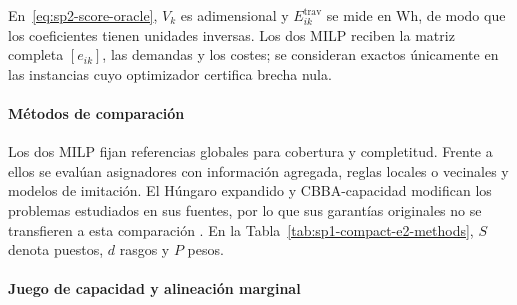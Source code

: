 En~\eqref{eq:sp2-score-oracle}, $V_k$ es adimensional y $E_{ik}^{\mathrm{trav}}$ se mide en Wh, de modo que los coeficientes tienen unidades inversas. Los dos MILP reciben la matriz completa $[e_{ik}]$, las demandas y los costes; se consideran exactos únicamente en las instancias cuyo optimizador certifica brecha nula.

\paragraph{Métodos de comparación}

Los dos MILP fijan referencias globales para cobertura y completitud. Frente a ellos se evalúan asignadores con información agregada, reglas locales o vecinales y modelos de imitación. El Húngaro expandido y CBBA-capacidad modifican los problemas estudiados en sus fuentes, por lo que sus garantías originales no se transfieren a esta comparación \parencite{kuhn1955Hungarian,choiBrunetHow2009CBBA}. En la Tabla~\ref{tab:sp1-compact-e2-methods}, $S$ denota puestos, $d$ rasgos y $P$ pesos.


\paragraph{Juego de capacidad y alineación marginal}

